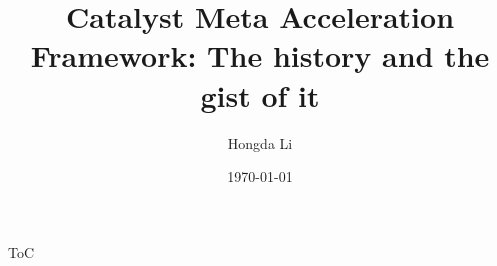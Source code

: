 \documentclass[11pt]{beamer}
\author{Hongda Li}
\title[Catalyst Acceleration]{Catalyst Meta Acceleration Framework: The history and the gist of it}
\institute[]{UBC Okanagan}
\date{\today}
\begin{document}
\begin{frame}
    \titlepage
\end{frame}

\begin{frame}{ToC}
    \tableofcontents
\end{frame}

    
            
                
        
\end{document}
